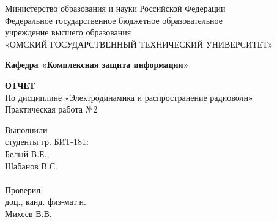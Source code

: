 \documentclass[14pt,a4paper]{scrartcl}
\begin{document}
  \begin{titlepage}                                                         
    \newpage                                                                        
    \begin{center}   
      Министерство образования и науки Российской Федерации  \\ 
      \vspace{1em}                                                    
      {\mdseries
        Федеральное государственное бюджетное образовательное \\
        учреждение высшего образования \\
        «ОМСКИЙ ГОСУДАРСТВЕННЫЙ ТЕХНИЧЕСКИЙ УНИВЕРСИТЕТ»
      }                               
      \vspace{1em}      

      {\bfseries Кафедра «Комплексная защита информации»}  

      \vspace{\fill}                                                         
                                   
      {\bfseries ОТЧЕТ } \\                                 
      По дисциплине «Электродинамика и распространение радиоволн» \\ 
      \vspace{1em} 
      Практическая работа №2 \\                                                           
    \end{center}                                                          
                                                                                        
    \vspace{\fill}                                                         
                                                                                        
    \hfill\parbox{5cm}{
      Выполнили\\
      студенты гр. БИТ-181:\\
      Белый В.Е., \\
      Шабанов В.С.\\
      \\
      Проверил:\\
      доц., канд. физ-мат.н. \\
      Михеев В.В.\\
    }                                                                                                                              
                                                                                                                                                                              

\end{titlepage}
\end{document}
